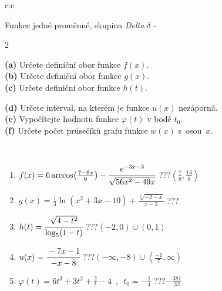 \documentclass[10pt]{report}
\begin{document}
\begin{tabular}{c:c}
\begin{minipage}[c][104.5mm][t]{0.5\linewidth}
\begin{center}
\vspace{7mm}
{\huge Funkce jedné proměnné, skupina \textit{Delta $\delta$} -}\\[5mm]
\begin{minipage}{0.95\linewidth}
\begin{center}
{\small \begin{multicols}{2} \raggedright
\textbf{(a)} Určete definiční obor funkce \(f(x)\). \\[1mm]
\textbf{(b)} Určete definiční obor funkce \(g(x)\). \\[1mm]
\textbf{(c)} Určete definiční obor funkce \(h(t)\). \par \columnbreak
\textbf{(d)} Určete interval, na kterém je funkce \(u(x)\) nezáporná. \\[1mm]
\textbf{(e)} Vypočítejte hodnotu funkce \(\varphi(t)\) v bodě \(t_0\). \\[1mm]
\textbf{(f)} Určete počet průsečíků grafu funkce \(w(x)\) s~osou~\(x\). \\[1mm]
\end{multicols}
}
\end{center}
\end{minipage}
\\[4mm]
\begin{minipage}{0.79\linewidth}
\begin{center}
\begin{varwidth}{\linewidth}
\begin{enumerate}
\small
\item $f(x) = 6\arccos\!\left( \frac{7-8x}{6} \right) - \cfrac{e^{-3x-3}}{\sqrt{56x^2-49x}}$\quad \dotfill\; ???\;\dotfill \quad $\left(\frac{7}{8} , \frac{13}{8}\right\rangle$
\item $g(x) = \frac{1}{3} \ln{\!(x^2+3x-10)}+\frac{\sqrt[3]{-2-x}}{x-3}$\quad \dotfill\; ???\;\dotfill {}
\item $h(t) = \cfrac{\sqrt{4-t^2}}{\log_5(1-t)}$\quad \dotfill\; ???\;\dotfill \quad $\left\langle-2 , 0\right)\cup\left(0 , 1\right\rangle$
\item $u(x) = \cfrac{-7x-1}{-x-8}$\quad \dotfill\; ???\;\dotfill \quad $\left(-\infty , -8\right)\cup\left\langle\frac{-1}{7} , \infty\right)$
\item $\varphi(t) = 6t^3+3t^2+\frac{2}{t}-4 \enspace , \enspace t_0=-\frac{1}{4}$\quad \dotfill\; ???\;\dotfill \quad $-\frac{381}{32}$

\end{enumerate}
\end{varwidth}
\end{center}
\end{minipage}
\end{center}
\end{minipage}
\end{tabular}
\end{document}
